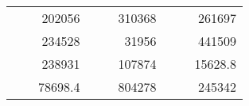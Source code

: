\begin{table}[]
\begin{tabular}{|ccrccrccc}
\rowcolor[HTML]{DAE8FC} 
\multicolumn{1}{|c|}{\cellcolor[HTML]{FFFFC7}}                                & \multicolumn{1}{c|}{\cellcolor[HTML]{DAE8FC}}                      & \multicolumn{1}{r|}{\cellcolor[HTML]{DAE8FC}202056}    & \multicolumn{1}{c|}{\cellcolor[HTML]{FFFFC7}}                                & \multicolumn{1}{c|}{\cellcolor[HTML]{DAE8FC}}                       & \multicolumn{1}{r|}{\cellcolor[HTML]{DAE8FC}310368}    & \multicolumn{1}{c|}{\cellcolor[HTML]{FFFFC7}}                                & \multicolumn{1}{c|}{\cellcolor[HTML]{DAE8FC}}                      & \multicolumn{1}{r|}{\cellcolor[HTML]{DAE8FC}261697}    \\ \cline{3-3} \cline{6-6} \cline{9-9} 
\multicolumn{1}{|c|}{\cellcolor[HTML]{FFFFC7}}                                & \multicolumn{1}{c|}{\cellcolor[HTML]{DAE8FC}}                      & \multicolumn{1}{r|}{\cellcolor[HTML]{DDFDFF}234528}    & \multicolumn{1}{c|}{\cellcolor[HTML]{FFFFC7}}                                & \multicolumn{1}{c|}{\cellcolor[HTML]{DAE8FC}}                       & \multicolumn{1}{r|}{\cellcolor[HTML]{DDFDFF}31956}     & \multicolumn{1}{c|}{\cellcolor[HTML]{FFFFC7}}                                & \multicolumn{1}{c|}{\cellcolor[HTML]{DAE8FC}}                      & \multicolumn{1}{r|}{\cellcolor[HTML]{DDFDFF}441509}    \\ \cline{3-3} \cline{6-6} \cline{9-9} 
\rowcolor[HTML]{DAE8FC} 
\multicolumn{1}{|c|}{\cellcolor[HTML]{FFFFC7}}                                & \multicolumn{1}{c|}{\cellcolor[HTML]{DAE8FC}}                      & \multicolumn{1}{r|}{\cellcolor[HTML]{DAE8FC}238931}    & \multicolumn{1}{c|}{\cellcolor[HTML]{FFFFC7}}                                & \multicolumn{1}{c|}{\cellcolor[HTML]{DAE8FC}}                       & \multicolumn{1}{r|}{\cellcolor[HTML]{DAE8FC}107874}    & \multicolumn{1}{c|}{\cellcolor[HTML]{FFFFC7}}                                & \multicolumn{1}{c|}{\cellcolor[HTML]{DAE8FC}}                      & \multicolumn{1}{r|}{\cellcolor[HTML]{DAE8FC}15628.8}   \\ \cline{3-3} \cline{6-6} \cline{9-9} 
\multicolumn{1}{|c|}{\cellcolor[HTML]{FFFFC7}}                                & \multicolumn{1}{c|}{\cellcolor[HTML]{DAE8FC}}                      & \multicolumn{1}{r|}{\cellcolor[HTML]{DDFDFF}78698.4}   & \multicolumn{1}{c|}{\cellcolor[HTML]{FFFFC7}}                                & \multicolumn{1}{c|}{\cellcolor[HTML]{DAE8FC}}                       & \multicolumn{1}{r|}{\cellcolor[HTML]{DDFDFF}804278}    & \multicolumn{1}{c|}{\cellcolor[HTML]{FFFFC7}}                                & \multicolumn{1}{c|}{\cellcolor[HTML]{DAE8FC}}                      & \multicolumn{1}{r|}{\cellcolor[HTML]{DDFDFF}245342}    \\ \cline{3-3} \cline{6-6} \cline{9-9} 

\end{tabular}
\end{table}
